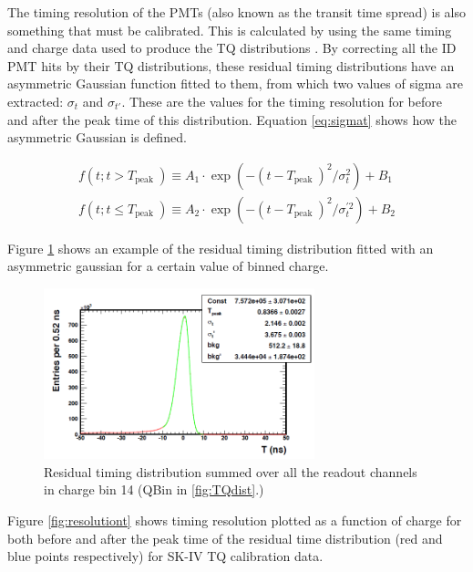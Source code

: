 The timing resolution of the PMTs (also known as the transit time spread) is also something that must be calibrated. This is calculated by using the same timing and charge data used to produce the TQ distributions \cite{dziomba2012study}. By correcting all the ID PMT hits by their TQ distributions, these residual timing distributions have an asymmetric Gaussian function fitted to them, from which two values of sigma are extracted: $\sigma_{t}$ and $\sigma_{t'}$. These are the values for the timing resolution for before and after the peak time of this distribution. Equation \ref{eq:sigmat} shows how the asymmetric Gaussian is defined. 

\begin{align}
    f\left(t ; t>T_{\text {peak }}\right) \equiv A_{1} \cdot \exp \left(-\left(t-T_{\text {peak }}\right)^{2} / \sigma_{t}^{2}\right)+B_{1}\\
    f\left(t ; t \leq T_{\text {peak }}\right) \equiv A_{2} \cdot \exp \left(-\left(t-T_{\text {peak }}\right)^{2} / \sigma_{t}^{\prime 2}\right)+B_{2}
\label{eq:sigmat}
\end{align}

Figure \ref{fig:asygausst} shows an example of the residual timing distribution fitted with an asymmetric gaussian for a certain value of binned charge.

\begin{figure}
    \centering
    \includegraphics[width=0.7\textwidth]{Figures/asygausst.png}
\caption{Residual timing distribution summed over all the readout channels in charge bin 14 (QBin in \ref{fig:TQdist}.)}
    \label{fig:asygausst}
\end{figure}



Figure \ref{fig:resolutiont} shows timing resolution  plotted as a function of charge for both before and after the peak time of the residual time distribution (red and blue points respectively) for SK-IV TQ calibration data. 

